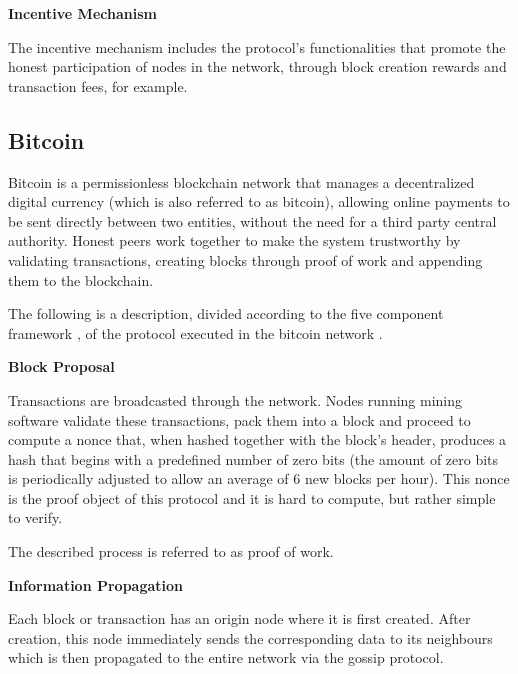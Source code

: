 \vspace{0.25cm}

\textbf{Incentive Mechanism}

The incentive mechanism includes the protocol’s functionalities that promote the honest participation of nodes in the network, through block creation rewards and transaction fees, for example.





\subsection{Bitcoin}

Bitcoin \cite{bitcoin} is a permissionless blockchain network that manages a decentralized digital currency (which is also referred to as bitcoin), allowing online payments to be sent directly between two entities, without the need for a third party central authority. Honest peers work together to make the system trustworthy by validating transactions, creating blocks through proof of work and appending them to the blockchain.

The following is a description, divided according to the five component framework \cite{survey_bchain_networks}, of the protocol executed in the bitcoin network \cite{bitcoin} \cite{info_propagation_bitcoin}.


\vspace{0.5cm}

\textbf{Block Proposal}

Transactions are broadcasted through the network. Nodes running mining software validate these transactions, pack them into a block and proceed to compute a nonce that, when hashed together with the block’s header, produces a hash that begins with a predefined number of zero bits (the amount of zero bits is periodically adjusted to allow an average of 6 new blocks per hour). This nonce is the proof object of this protocol and it is hard to compute, but rather simple to verify.

The described process is referred to as proof of work.

\vspace{0.25cm}


\textbf{Information Propagation}

Each block or transaction has an origin node where it is first created. After creation, this node immediately sends the corresponding data to its neighbours which is then propagated to the entire network via the gossip protocol.

